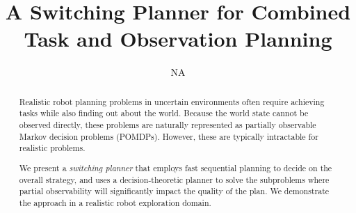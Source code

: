 \documentclass[letterpaper]{article}
\title{A Switching Planner for Combined Task and Observation Planning}
\author{NA}
\begin{document}
 
\maketitle

\begin{abstract}

Realistic robot planning problems in uncertain environments often
require achieving tasks while also finding out about the
world. Because the world state cannot be observed directly, these
problems are naturally represented as partially observable Markov
decision problems (POMDPs). However, these are typically intractable
for realistic problems.

We present a \emph{switching planner} that employs fast sequential
planning to decide on the overall strategy, and uses a
decision-theoretic planner to solve the subproblems where partial
observability will significantly impact the quality of the plan. We
demonstrate the approach in a realistic robot exploration domain.

\end{abstract}





\end{document}
